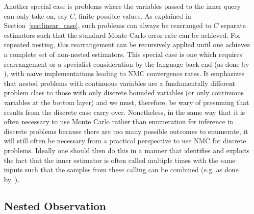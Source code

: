 Another special case is problems where the variables passed to the inner query can only take on, say $C$, finite
possible values. As
explained in Section~\ref{sec:linear_case}, such problems can always be rearranged to
$C$ separate estimators such that the standard Monte Carlo error rate can be achieved.
For repeated nesting, this rearrangement can be recursively applied until one achieves
a complete set of non-nested estimators.  This special case is one which requires rearrangement
or a specialist consideration by the language back-end (as done by \cite{stuhlmuller2012dynamic,stuhlmuller2014reasoning,cornish2017efficient}),
with na\"{i}ve implementations leading to NMC convergence rates.  It emphasizes that
nested problems with continuous variables are a fundamentally different problem
class to those with only discrete bounded variables (or only continuous variables at the bottom layer)
and we must, therefore, be wary of presuming that results from the discrete case carry over.
Nonetheless, in the same way that it is often necessary to use Monte Carlo rather than enumeration
for inference in discrete problems because there are too many possible outcomes to enumerate, 
it will still often be necessary from a practical perspective
to use NMC for discrete problems. Ideally one should then do this in a manner that identifies and exploits the fact that
the inner estimator is often called multiple times with the same inputs such that the samples
from these calling can be combined (e.g. as done by~\cite{stuhlmuller2012dynamic}).

\subsection{Nested Observation}
\label{sec:nest:imp:obs}

